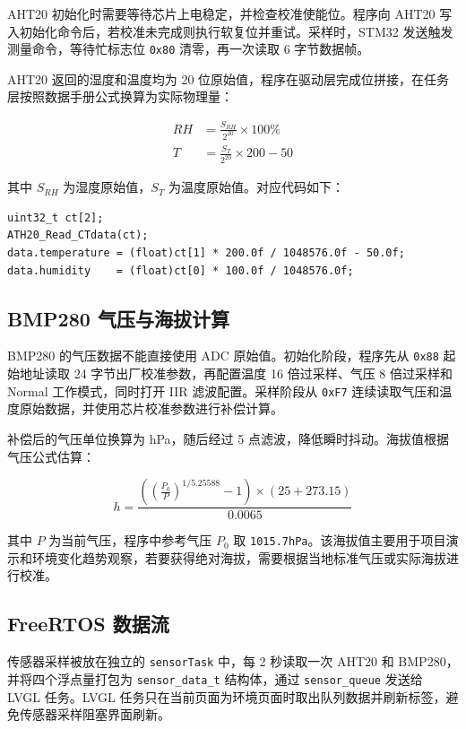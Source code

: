 \documentclass[12pt,a4paper]{ctexart}
\begin{document}
AHT20 初始化时需要等待芯片上电稳定，并检查校准使能位。程序向 AHT20 写入初始化命令后，若校准未完成则执行软复位并重试。采样时，STM32 发送触发测量命令，等待忙标志位 \texttt{0x80} 清零，再一次读取 6 字节数据帧。

AHT20 返回的湿度和温度均为 20 位原始值，程序在驱动层完成位拼接，在任务层按照数据手册公式换算为实际物理量：

\begin{align}
RH &= \frac{S_{RH}}{2^{20}} \times 100\% \\
T  &= \frac{S_T}{2^{20}} \times 200 - 50
\end{align}

其中 $S_{RH}$ 为湿度原始值，$S_T$ 为温度原始值。对应代码如下：

\begin{lstlisting}
uint32_t ct[2];
ATH20_Read_CTdata(ct);
data.temperature = (float)ct[1] * 200.0f / 1048576.0f - 50.0f;
data.humidity    = (float)ct[0] * 100.0f / 1048576.0f;
\end{lstlisting}

\subsection{BMP280 气压与海拔计算}

BMP280 的气压数据不能直接使用 ADC 原始值。初始化阶段，程序先从 \texttt{0x88} 起始地址读取 24 字节出厂校准参数，再配置温度 16 倍过采样、气压 8 倍过采样和 Normal 工作模式，同时打开 IIR 滤波配置。采样阶段从 \texttt{0xF7} 连续读取气压和温度原始数据，并使用芯片校准参数进行补偿计算。

补偿后的气压单位换算为 hPa，随后经过 5 点滤波，降低瞬时抖动。海拔值根据气压公式估算：

\begin{equation}
h = \frac{\left( \left(\frac{P_0}{P}\right)^{1/5.25588} - 1 \right) \times (25 + 273.15)}{0.0065}
\end{equation}

其中 $P$ 为当前气压，程序中参考气压 $P_0$ 取 \texttt{1015.7hPa}。该海拔值主要用于项目演示和环境变化趋势观察，若要获得绝对海拔，需要根据当地标准气压或实际海拔进行校准。

\subsection{FreeRTOS 数据流}

传感器采样被放在独立的 \texttt{sensorTask} 中，每 2 秒读取一次 AHT20 和 BMP280，并将四个浮点量打包为 \texttt{sensor\_data\_t} 结构体，通过 \texttt{sensor\_queue} 发送给 LVGL 任务。LVGL 任务只在当前页面为环境页面时取出队列数据并刷新标签，避免传感器采样阻塞界面刷新。
\end{document}
